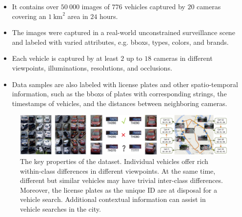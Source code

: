 \begin{itemize}
    \item It contains over $50\ 000$ images of $776$ vehicles captured by $20$ cameras covering an $1\  \text{km}^2$ area in $24$ hours.
    
    \item The images were captured in a real-world unconstrained surveillance scene and labeled with varied attributes, e.g. \glspl{bbox}, types, colors, and brands.
    
    \item Each vehicle is captured by at least $2$ up to $18$ cameras in different viewpoints, illuminations, resolutions, and occlusions.
    
    \item Data samples are also labeled with license plates and other spatio-temporal information, such as the \glspl{bbox} of plates with corresponding strings, the timestamps of vehicles, and the distances between neighboring cameras.
\end{itemize}

\begin{figure}[t]
    \centerline{\includegraphics[width=\linewidth]{figures/datasets/veri776__overview.pdf}}
    \caption[ dataset]{The key properties of the  dataset. Individual vehicles offer rich within-class differences in different viewpoints. At the same time, different but similar vehicles may have trivial inter-class differences. Moreover, the license plates as the unique ID are at disposal for a vehicle search. Additional contextual information can assist in vehicle searches in the city. }
    \label{fig:DatasetVeRI776}
\end{figure}
